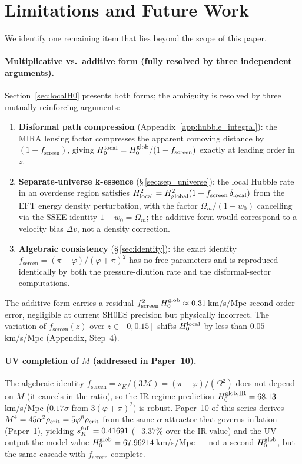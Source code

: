 \documentclass[12pt,a4paper]{article}
\newcommand{\phiG}{\varphi}
\newcommand{\MIRA}{\mathcal{M}}
\newcommand{\Omm}{\Omega_{m}}
\newcommand{\fsc}{f_{\mathrm{screen}}}
\newcommand{\sK}{s_K}          %
\renewcommand{\Omega}{\varOmega}
\begin{document}
\section{Limitations and Future Work}
\label{sec:limitations}

We identify one remaining item that lies beyond the scope of this paper.

\paragraph{Multiplicative vs.\ additive form (fully resolved by three independent arguments).}
Section~\ref{sec:localH0} presents both forms; the ambiguity is resolved by three
mutually reinforcing arguments:
\begin{enumerate}[label=(\roman*),itemsep=0pt]
  \item \textbf{Disformal path compression} (Appendix~\ref{app:hubble_integral}):
    the MIRA lensing factor compresses the apparent comoving distance by $(1-\fsc)$,
    giving $H_0^{\rm local} = H_0^{\rm glob}/(1-\fsc)$ exactly at leading order in~$z$.
  \item \textbf{Separate-universe k-essence} (\S\,\ref{sec:sep_universe}):
    the local Hubble rate in an overdense region satisfies
    $H_{\rm local}^2 = H_{\rm global}^2(1 + \fsc\,\delta_{\rm local})$
    from the EFT energy density perturbation, with the factor $\Omm/(1+w_0)$
    cancelling via the SSEE identity $1+w_0 = \Omm$; the additive form would
    correspond to a velocity bias $\Delta v$, not a density correction.
  \item \textbf{Algebraic consistency} (\S\,\ref{sec:identity}):
    the exact identity $\fsc = (\pi-\phiG)/(\phiG+\pi)^2$ has no free parameters
    and is reproduced identically by both the pressure-dilution rate and the disformal-sector
    computations.
\end{enumerate}
The additive form carries a residual $\fsc^2\,H_0^{\rm glob} \approx 0.31$\,km/s/Mpc
second-order error, negligible at current SH0ES precision but physically incorrect.
The variation of $\fsc(z)$ over $z\in[0,0.15]$ shifts $H_0^{\rm local}$ by less
than $0.05$\,km/s/Mpc (Appendix, Step~4).

\paragraph{UV completion of $M$ (addressed in Paper~10).}
The algebraic identity $\fsc = \sK/(3\MIRA) = (\pi-\phiG)/(\Omega^2)$ does not
depend on $M$ (it cancels in the ratio), so the IR-regime prediction
$H_0^{\rm glob,IR} = 68.13$\,km/s/Mpc ($0.17\sigma$ from $3(\phiG+\pi)^2$) is robust.
Paper~10 of this series \citep{Paper10} derives $M^4 = 45\alpha^2\rho_{\rm crit} = 5\phiG^8\rho_{\rm crit}$
from the same $\alpha$-attractor that governs inflation (Paper~1), yielding
$\sK^{\rm full} = 0.41691$ ($+3.37\%$ over the IR value) and the UV output
the model value $H_0^{\rm glob} = 67.96214$\,km/s/Mpc --- not a second
$H_0^{\rm glob}$, but the same cascade with $\fsc$ complete.
\end{document}
